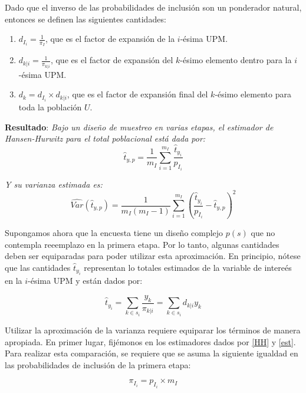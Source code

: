 \documentclass[
  10pt,
  spanish,
]{book}
\providecommand{\tightlist}{%
  \setlength{\itemsep}{0pt}\setlength{\parskip}{0pt}}
\begin{document}
Dado que el inverso de las probabilidades de inclusión son un ponderador natural, entonces se definen las siguientes cantidades:

\begin{enumerate}
\def\labelenumi{\arabic{enumi}.}
\tightlist
\item
  \(d_{I_i} = \frac{1}{\pi_I}\), que es el factor de expansión de la \(i\)-ésima UPM.
\item
  \(d_{k|i} = \frac{1}{\pi_{k|i}}\), que es el factor de expansión del \(k\)-ésimo elemento dentro para la \(i\)-ésima UPM.
\item
  \(d_k = d_{I_i} \times d_{k|i}\), que es el factor de expansión final del \(k\)-ésimo elemento para toda la población \(U\).
\end{enumerate}

\textbf{Resultado}: \emph{Bajo un diseño de muestreo en varias etapas, el estimador de Hansen-Hurwitz para el total poblacional está dada por:}
\begin{equation}
\label{HH}
\hat{t}_{y,p}=\frac{1}{m_I}\sum_{i=1}^{m_I}\frac{\hat{t}_{y_i}}{p_{I_i}}
\end{equation}

\emph{Y su varianza estimada es:}
\begin{equation}
\label{var}
\widehat{Var}(\hat{t}_{y,p})=\frac{1}{m_I(m_I-1)}\sum_{i=1}^{m_I}\left(\frac{\hat{t}_{y_i}}{p_{I_i}}-\hat{t}_{y,p}\right)^2
\end{equation}

Supongamos ahora que la encuesta tiene un diseño complejo \(p(s)\) que no contempla reeemplazo en la primera etapa. Por lo tanto, algunas cantidades deben ser equiparadas para poder utilizar esta aproximación. En principio, nótese que las cantidades \(\hat{t}_{y_i}\) representan lo totales estimados de la variable de intereés en la \(i\)-ésima UPM y están dados por:

\begin{equation}
\hat{t}_{y_i} = \sum_{k \in s_i} \frac{y_k}{\pi_{k|i}}
= \sum_{k \in s_i} d_{k|i} y_k 
\end{equation}

Utilizar la aproximación de la varianza requiere equiparar los términos de manera apropiada. En primer lugar, fijémonos en los estimadores dados por \eqref{HH} y \eqref{est}. Para realizar esta comparación, se requiere que
se asuma la siguiente igualdad en las probabilidades de inclusión de la primera etapa:

\begin{equation}
\label{cons}
\pi_{I_i} = p_{I_i} \times m_I 
\end{equation}
\end{document}
